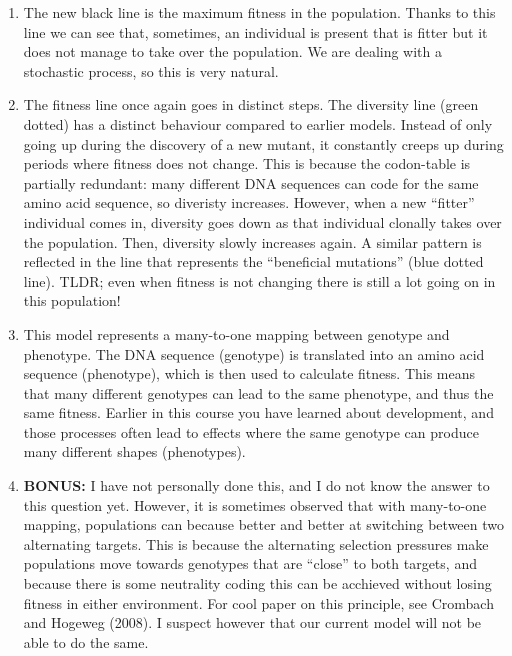\documentclass[
  letterpaper,
  DIV=11,
  numbers=noendperiod]{scrreprt}
\providecommand{\tightlist}{%
  \setlength{\itemsep}{0pt}\setlength{\parskip}{0pt}}\usepackage{longtable,booktabs,array}
\theoremstyle{definition}
\theoremstyle{remark}
\begin{document}
\begin{enumerate}
\def\labelenumi{\alph{enumi}.}
\tightlist
\item
  The new black line is the maximum fitness in the population. Thanks to
  this line we can see that, sometimes, an individual is present that is
  fitter but it does not manage to take over the population. We are
  dealing with a stochastic process, so this is very natural.
\item
  The fitness line once again goes in distinct steps. The diversity line
  (green dotted) has a distinct behaviour compared to earlier models.
  Instead of only going up during the discovery of a new mutant, it
  constantly creeps up during periods where fitness does not change.
  This is because the codon-table is partially redundant: many different
  DNA sequences can code for the same amino acid sequence, so diveristy
  increases. However, when a new ``fitter'' individual comes in,
  diversity goes down as that individual clonally takes over the
  population. Then, diversity slowly increases again. A similar pattern
  is reflected in the line that represents the ``beneficial mutations''
  (blue dotted line). TLDR; even when fitness is not changing there is
  still a lot going on in this population!
\item
  This model represents a many-to-one mapping between genotype and
  phenotype. The DNA sequence (genotype) is translated into an amino
  acid sequence (phenotype), which is then used to calculate fitness.
  This means that many different genotypes can lead to the same
  phenotype, and thus the same fitness. Earlier in this course you have
  learned about development, and those processes often lead to effects
  where the same genotype can produce many different shapes
  (phenotypes).
\item
  \textbf{BONUS:} I have not personally done this, and I do not know the
  answer to this question yet. However, it is sometimes observed that
  with many-to-one mapping, populations can because better and better at
  switching between two alternating targets. This is because the
  alternating selection pressures make populations move towards
  genotypes that are ``close'' to both targets, and because there is
  some neutrality coding this can be acchieved without losing fitness in
  either environment. For cool paper on this principle, see Crombach and
  Hogeweg (2008). I suspect however that our current model will not be
  able to do the same.
\end{enumerate}
\end{document}
